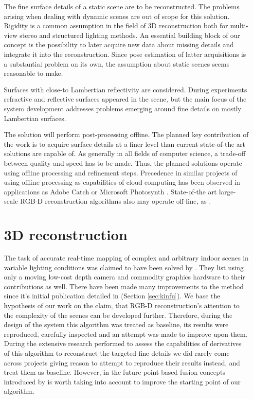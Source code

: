 \documentclass{ucl_thesis}
\newcommand{\secref}[1]{(Section \ref{#1})}
\begin{document}
\par The fine surface details of a static scene are to be reconstructed. The problems arising when dealing with dynamic scenes are out of scope for this solution. Rigidity is a common assumption in the field of 3D reconstruction both for multi-view stereo and structured lighting methods. An essential building block of our concept is the possibility to later acquire new data about missing details and integrate it into the reconstruction. Since pose estimation of latter acquisitions is a substantial problem on its own, the assumption about static scenes seems reasonable to make. \\

\par Surfaces with close-to Lambertian reflectivity are considered. During experiments refractive and reflective surfaces appeared in the scene, but the main focus of the system development addresses problems emerging around fine details on mostly Lambertian surfaces. \\

\par The solution will perform post-processing offline. The planned key contribution of the work is to acquire surface details at a finer level than current state-of-the art solutions are capable of. As generally in all fields of computer science, a trade-off between quality and speed has to be made. Thus, the planned solutions operate using offline processing and refinement steps. Precedence in similar projects of using offline processing as capabilities of cloud computing has been observed in applications as Adobe Catch \citep{AdobeCatch} or Microsoft Photosynth \citep{Photosynth}. State-of-the art large-scale RGB-D reconstruction algorithms also may operate off-line, as \citep{Zhou:2013}. \\

\section{3D reconstruction}

The task of accurate real-time mapping of complex and
arbitrary indoor scenes in variable lighting conditions was claimed to have been solved by \citep{Newcombe11}. They list using only a
moving low-cost depth camera and commodity graphics hardware to their contributions as well. There have been made many improvements to the method since it's initial publication detailed in \secref{sec:kinfu}. We base the hypothesis of our work on the claim, that RGB-D reconstruction's attention to the complexity of the scenes can be developed further. Therefore, during the design of the system this algorithm was treated as baseline, its results were reproduced, carefully inspected and an attempt was made to improve upon them. During the extensive research performed to assess the capabilities of derivatives of this algorithm to reconstruct the targeted fine details we did rarely come across projects giving reason to attempt to reproduce their results instead, and treat them as baseline. However, in the future point-based fusion concepts introduced by \citep{keller13realtime} is worth taking into account to improve the starting point of our algorithm.
\end{document}
